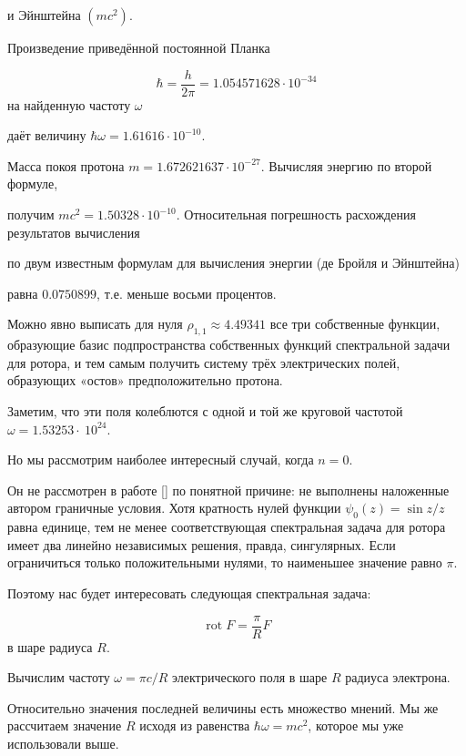 и Эйнштейна $(mc^2)$.



Произведение приведённой постоянной Планка 

$$\hbar = \frac{h}{2\pi}= 1.054571628\cdot 10^{-34}$$ на найденную частоту $\omega$ 

даёт величину $\hbar\omega = 1.61616\cdot 10^{-10}$.

 

Масса покоя протона $m = 1.672621637\cdot 10^{-27}$. Вычисляя энергию по второй формуле, 

получим $mc^2 = 1.50328\cdot 10^{-10}$. Относительная погрешность расхождения результатов вычисления 

по двум известным формулам для вычисления энергии (де Бройля и Эйнштейна) 

равна $0.0750899$, т.е. меньше восьми процентов. 



Можно явно выписать для нуля $\rho_{1,1} \approx 4.49341$ все три собственные функции, образующие базис подпространства собственных функций спектральной задачи для ротора, и тем самым получить систему трёх электрических полей, образующих «остов» предположительно протона. 

Заметим, что эти поля колеблются с одной и той же круговой частотой $\omega = 1.53253\cdot~10^{24}$.

 

Но мы рассмотрим наиболее интересный случай, когда $n = 0$. 

Он не рассмотрен в работе [] по понятной причине: не выполнены наложенные автором граничные условия. Хотя кратность нулей функции $\psi_0(z) = {\sin z}/{z}$ равна единице, тем не менее соответствующая спектральная задача для ротора имеет два линейно независимых решения, правда, сингулярных. Если ограничиться только положительными нулями, то наименьшее значение равно $\pi$. 

Поэтому нас будет интересовать следующая спектральная задача: 

$$\displaystyle\mathop{\mathrm{rot}} F = \frac{\pi}{R} F$$ в шаре радиуса $R$. 



Вычислим частоту $\displaystyle\omega = \pi {c}/{R}$ электрического поля в шаре $R$ радиуса электрона. 

Относительно значения последней величины есть множество мнений. Мы же рассчитаем значение $R$ исходя из равенства $\hbar\omega = mc^2$, которое мы уже использовали выше. 

